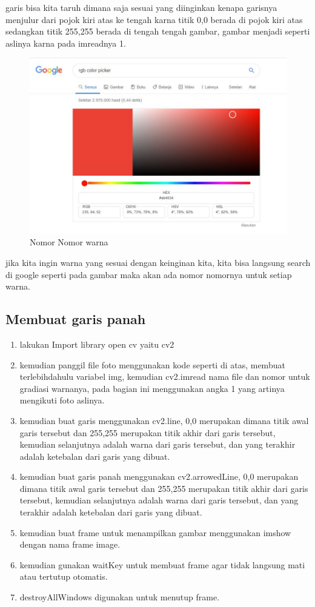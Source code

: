 garis bisa kita taruh dimana saja sesuai yang diinginkan kenapa garisnya menjulur dari pojok kiri atas ke tengah karna titik 0,0 berada di pojok kiri atas sedangkan titik 255,255 berada di tengah tengah gambar, gambar menjadi seperti aslinya karna pada imreadnya 1.

\newpage
\begin{figure}[ht]
\centering
\includegraphics[scale=0.5]{figures/2,9,1.jpg}
\caption{Nomor Nomor warna}
\label{contoh}
\end{figure}

jika kita ingin warna yang sesuai dengan keinginan kita, kita bisa langsung search di google seperti pada gambar maka akan ada nomor nomornya untuk setiap warna.

\newpage
\subsection{Membuat garis panah}

\begin{enumerate}
	\item lakukan Import library open cv yaitu cv2
	\item kemudian panggil file foto menggunakan kode seperti di atas, membuat terlebihdahulu variabel img, kemudian cv2.imread nama file dan nomor untuk gradiasi warnanya, pada bagian ini menggunakan angka 1 yang artinya mengikuti foto aslinya.
	\item kemudian buat garis menggunakan cv2.line, 0,0 merupakan dimana titik awal garis tersebut dan 255,255 merupakan titik akhir dari garis tersebut, kemudian selanjutnya adalah warna dari garis tersebut, dan yang terakhir adalah ketebalan dari garis yang dibuat.
	\item kemudian buat garis panah menggunakan cv2.arrowedLine, 0,0 merupakan dimana titik awal garis tersebut dan 255,255 merupakan titik akhir dari garis tersebut, kemudian selanjutnya adalah warna dari garis tersebut, dan yang terakhir adalah ketebalan dari garis yang dibuat.
	\item kemudian buat frame untuk menampilkan gambar menggunakan imshow dengan nama frame image.
	\item kemudian gunakan waitKey untuk membuat frame agar tidak langsung mati atau tertutup otomatis.
	\item destroyAllWindows digunakan untuk menutup frame.
\end{enumerate}

